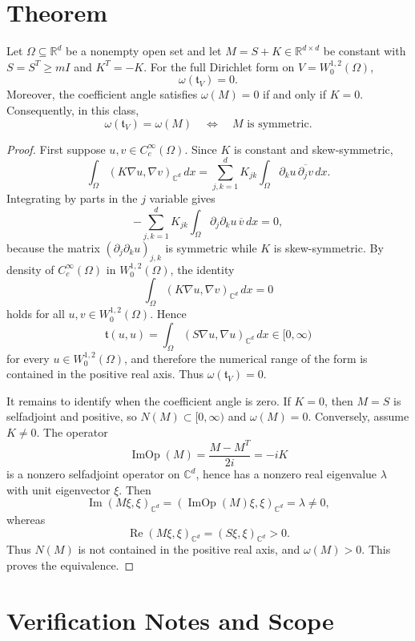 \documentclass[11pt]{amsart}
\newcommand{\R}{\mathbb{R}}
\newcommand{\C}{\mathbb{C}}
\newcommand{\tform}{\mathfrak{t}}
\begin{document}
\section*{Theorem}

Let $\Omega\subseteq\R^d$ be a nonempty open set and let
$M=S+K\in\R^{d\times d}$ be constant with $S=S^T\geq mI$ and $K^T=-K$. For the
full Dirichlet form on $V=W^{1,2}_0(\Omega)$,
\[
  \omega(\tform_V)=0.
\]
Moreover, the coefficient angle satisfies $\omega(M)=0$ if and only if
$K=0$. Consequently, in this class,
\[
  \omega(\tform_V)=\omega(M)
  \quad\Longleftrightarrow\quad
  M \text{ is symmetric}.
\]

\begin{proof}
First suppose $u,v\in C_c^\infty(\Omega)$. Since $K$ is constant and
skew-symmetric,
\[
  \int_\Omega (K\nabla u,\nabla v)_{\C^d}\,dx
  =
  \sum_{j,k=1}^d K_{jk}\int_\Omega \partial_k u\,\overline{\partial_j v}\,dx.
\]
Integrating by parts in the $j$ variable gives
\[
  -\sum_{j,k=1}^d K_{jk}\int_\Omega
  \partial_j\partial_k u\,\overline{v}\,dx=0,
\]
because the matrix $(\partial_j\partial_k u)_{j,k}$ is symmetric while
$K$ is skew-symmetric. By density of $C_c^\infty(\Omega)$ in $W^{1,2}_0(\Omega)$,
the identity
\[
  \int_\Omega (K\nabla u,\nabla v)_{\C^d}\,dx=0
\]
holds for all $u,v\in W^{1,2}_0(\Omega)$. Hence
\[
  \tform(u,u)=\int_\Omega (S\nabla u,\nabla u)_{\C^d}\,dx\in [0,\infty)
\]
for every $u\in W^{1,2}_0(\Omega)$, and therefore the numerical range of the
form is contained in the positive real axis. Thus $\omega(\tform_V)=0$.

It remains to identify when the coefficient angle is zero. If $K=0$, then
$M=S$ is selfadjoint and positive, so $N(M)\subset [0,\infty)$ and
$\omega(M)=0$. Conversely, assume $K\neq 0$. The operator
\[
  \operatorname{ImOp}(M)=\frac{M-M^T}{2i}=-iK
\]
is a nonzero selfadjoint operator on $\C^d$, hence has a nonzero real
eigenvalue $\lambda$ with unit eigenvector $\xi$. Then
\[
  \operatorname{Im}(M\xi,\xi)_{\C^d}
  =(\operatorname{ImOp}(M)\xi,\xi)_{\C^d}
  =\lambda\neq 0,
\]
whereas
\[
  \operatorname{Re}(M\xi,\xi)_{\C^d}
  =(S\xi,\xi)_{\C^d}>0.
\]
Thus $N(M)$ is not contained in the positive real axis, and $\omega(M)>0$.
This proves the equivalence.
\end{proof}

\section*{Verification Notes and Scope}
\end{document}
